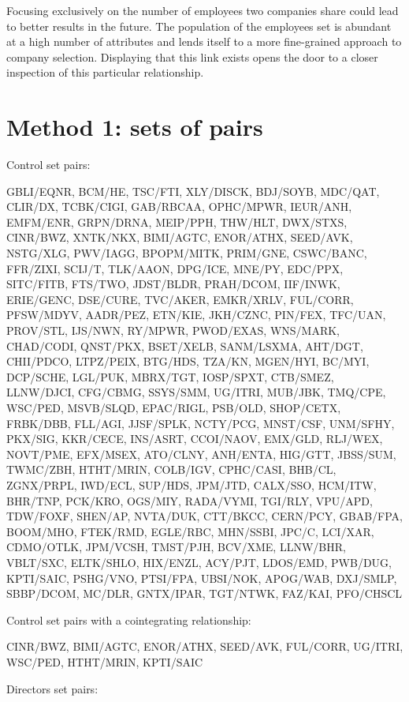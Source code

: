 \documentclass{UoYCSproject}
\begin{document}
Focusing exclusively on the number of employees two companies share could lead to better results in the future. The population of the employees set is abundant at a high number of attributes and lends itself to a more fine-grained approach to company selection. Displaying that this link exists opens the door to a closer inspection of this particular relationship.

\appendix
\chapter{Method 1: sets of pairs}

{\setlength{\parindent}{0cm}
Control set pairs:

GBLI/EQNR, BCM/HE, TSC/FTI, XLY/DISCK, BDJ/SOYB, MDC/QAT, CLIR/DX, TCBK/CIGI, GAB/RBCAA, OPHC/MPWR, IEUR/ANH, EMFM/ENR, GRPN/DRNA, MEIP/PPH, THW/HLT, DWX/STXS, CINR/BWZ, XNTK/NKX, BIMI/AGTC, ENOR/ATHX, SEED/AVK, NSTG/XLG, PWV/IAGG, BPOPM/MITK, PRIM/GNE, CSWC/BANC, FFR/ZIXI, SCIJ/T, TLK/AAON, DPG/ICE, MNE/PY, EDC/PPX, SITC/FITB, FTS/TWO, JDST/BLDR, PRAH/DCOM, IIF/INWK, ERIE/GENC, DSE/CURE, TVC/AKER, EMKR/XRLV, FUL/CORR, PFSW/MDYV, AADR/PEZ, ETN/KIE, JKH/CZNC, PIN/FEX, TFC/UAN, PROV/STL, IJS/NWN, RY/MPWR, PWOD/EXAS, WNS/MARK, CHAD/CODI, QNST/PKX, BSET/XELB, SANM/LSXMA, AHT/DGT, CHII/PDCO, LTPZ/PEIX, BTG/HDS, TZA/KN, MGEN/HYI, BC/MYI, DCP/SCHE, LGL/PUK, MBRX/TGT, IOSP/SPXT, CTB/SMEZ, LLNW/DJCI, CFG/CBMG, SSYS/SMM, UG/ITRI, MUB/JBK, TMQ/CPE, WSC/PED, MSVB/SLQD, EPAC/RIGL, PSB/OLD, SHOP/CETX, FRBK/DBB, FLL/AGI, JJSF/SPLK, NCTY/PCG, MNST/CSF, UNM/SFHY, PKX/SIG, KKR/CECE, INS/ASRT, CCOI/NAOV, EMX/GLD, RLJ/WEX, NOVT/PME, EFX/MSEX, ATO/CLNY, ANH/ENTA, HIG/GTT, JBSS/SUM, TWMC/ZBH, HTHT/MRIN, COLB/IGV, CPHC/CASI, BHB/CL, ZGNX/PRPL, IWD/ECL, SUP/HDS, JPM/JTD, CALX/SSO, HCM/ITW, BHR/TNP, PCK/KRO, OGS/MIY, RADA/VYMI, TGI/RLY, VPU/APD, TDW/FOXF, SHEN/AP, NVTA/DUK, CTT/BKCC, CERN/PCY, GBAB/FPA, BOOM/MHO, FTEK/RMD, EGLE/RBC, MHN/SSBI, JPC/C, LCI/XAR, CDMO/OTLK, JPM/VCSH, TMST/PJH, BCV/XME, LLNW/BHR, VBLT/SXC, ELTK/SHLO, HIX/ENZL, ACY/PJT, LDOS/EMD, PWB/DUG, KPTI/SAIC, PSHG/VNO, PTSI/FPA, UBSI/NOK, APOG/WAB, DXJ/SMLP, SBBP/DCOM, MC/DLR, GNTX/IPAR, TGT/NTWK, FAZ/KAI, PFO/CHSCL

Control set pairs with a cointegrating relationship:

CINR/BWZ, BIMI/AGTC, ENOR/ATHX, SEED/AVK, FUL/CORR, UG/ITRI, WSC/PED, HTHT/MRIN, KPTI/SAIC

Directors set pairs:

}
\end{document}
